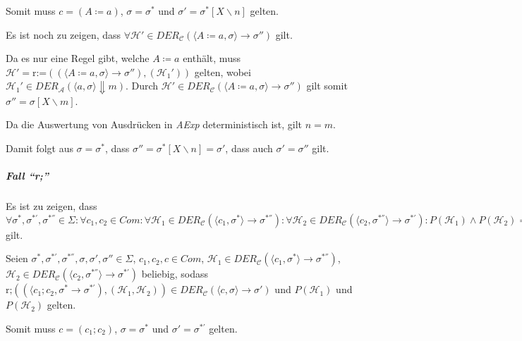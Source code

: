				    Somit muss $ c = (A \coloneqq a) $, $ \sigma = \sigma ^ * $ und $ \sigma' = \sigma ^ * [X \backslash n] $ gelten.
				    
				    Es ist noch zu zeigen, dass $ \forall \mathcal{H}' \in \textit{DER} _ \mathcal{C} (\langle A \coloneqq a, \sigma \rangle \rightarrow \sigma'') $ gilt.
				    
				    Da es nur eine Regel gibt, welche $ A \coloneqq a $ enthält, muss $ \mathcal{H}' = \text{r:=}((\langle A \coloneqq a, \sigma \rangle \rightarrow \sigma''), (\mathcal{H} _ 1 ')) $ gelten, wobei $ \mathcal{H} _ 1 ' \in \textit{DER} _ \mathcal{A} (\langle a, \sigma \rangle \Downarrow m) $. Durch $ \mathcal{H}' \in \textit{DER} _ \mathcal{C} (\langle A \coloneqq a, \sigma \rangle \rightarrow \sigma'') $ gilt somit $ \sigma'' = \sigma[X \backslash m] $.
				    
				    Da die Auswertung von Ausdrücken in \textit{AExp} deterministisch ist, gilt $ n = m $.
				    
				    Damit folgt aus $ \sigma = \sigma ^ * $, dass $ \sigma'' = \sigma ^ * [X \backslash n] = \sigma' $, dass auch $ \sigma' = \sigma'' $ gilt.
			    
			    \subparagraph{Fall \enquote{r;}}
				    Es ist zu zeigen, dass $ \forall \sigma ^ *, \sigma ^ {*'}, \sigma ^ {*''} \in \Sigma : \forall c _ 1, c _ 2 \in \textit{Com} : \forall \mathcal{H} _ 1 \in \textit{DER} _ \mathcal{C} (\langle c _ 1, \sigma ^ * \rangle \rightarrow \sigma ^ {*''}) : \forall \mathcal{H} _ 2 \in \textit{DER} _ \mathcal{C} (\langle c _ 2, \sigma ^ {*''} \rangle \rightarrow \sigma ^ {*'}) : P(\mathcal{H} _ 1) \land P(\mathcal{H} _ 2) \implies P(\text{r;}((\langle c _ 1 ; c _ 2, \sigma ^ * \rangle \rightarrow \sigma ^ {*'}), (\mathcal{H} _ 1, \mathcal{H} _ 2))) $ gilt.
				    
				    Seien $ \sigma ^ *, \sigma ^ {*'}, \sigma ^ {*''}, \sigma, \sigma', \sigma'' \in \Sigma $, $ c _ 1, c _ 2, c \in \textit{Com} $, $ \mathcal{H} _ 1 \in \textit{DER} _ \mathcal{C} (\langle c _ 1, \sigma ^ * \rangle \rightarrow \sigma ^ {*''}) $, $ \mathcal{H} _ 2 \in \textit{DER} _ \mathcal{C} (\langle c _ 2, \sigma ^ {*''} \rangle \rightarrow \sigma ^ {*'}) $ beliebig, sodass $ \text{r;}((\langle c _ 1 ; c _ 2, \sigma ^ * \rightarrow \sigma ^ {*'}), (\mathcal{H} _ 1, \mathcal{H} _ 2)) \in \textit{DER} _ \mathcal{C} (\langle c, \sigma \rangle \rightarrow \sigma') $ und $ P(\mathcal{H} _ 1) $ und $ P(\mathcal{H} _ 2) $ gelten.
				    
				    Somit muss $ c = (c _ 1 ; c _ 2) $, $ \sigma = \sigma ^ * $ und $ \sigma' = \sigma ^ {*'} $ gelten.
				    

